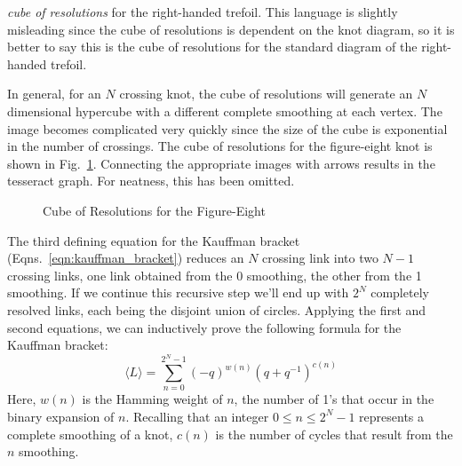        \textit{cube of resolutions} for the right-handed trefoil.
        This language is slightly misleading since the cube of
        resolutions is dependent on the knot diagram, so it is better to say
        this is the cube of resolutions for the standard diagram of
        the right-handed trefoil.
        \par\hfill\par
        In general, for an $N$ crossing knot, the cube of resolutions will
        generate an $N$ dimensional hypercube with a different complete
        smoothing at each vertex. The image becomes complicated very quickly
        since the size of the cube is exponential in the number of crossings.
        The cube of resolutions for the figure-eight knot is shown in
        Fig.~\ref{fig:figure_eight_knot_cube_of_resolutions}.
        Connecting the appropriate images with arrows results in the tesseract
        graph. For neatness, this has been omitted.
        \begin{figure}
            \centering
            \caption{Cube of Resolutions for the Figure-Eight}
            \label{fig:figure_eight_knot_cube_of_resolutions}
        \end{figure}
        \par\hfill\par
        The third defining equation for the Kauffman bracket
        (Eqns.~\ref{eqn:kauffman_bracket})
        reduces an $N$ crossing link into two $N-1$ crossing
        links, one link obtained from the 0 smoothing, the other from the
        1 smoothing. If we continue this recursive step we'll end up with
        $2^{N}$ completely resolved links, each being the disjoint union of
        circles. Applying the first and second equations, we can inductively
        prove the following formula for the Kauffman bracket:
        \begin{equation}
            \label{eqn:kauffman_bracket}%
            \langle{L}\rangle=\sum_{n=0}^{2^{N}-1}
                (-q)^{w(n)}(q+q^{-1})^{c(n)}
        \end{equation}
        Here, $w(n)$ is the Hamming weight of $n$, the number of 1's
        that occur in the binary expansion of $n$. Recalling that an integer
        $0\leq{n}\leq{2}^{N}-1$ represents a complete smoothing of a knot,
        $c(n)$ is the number of cycles that result from the $n$ smoothing.
        \par\hfill\par
